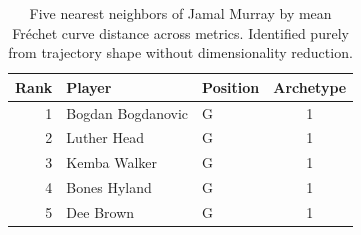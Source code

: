 \begin{table}[htbp]
  \centering\small
  \begin{tabular}{rllc}
    \toprule
    Rank & Player & Position & Archetype \\
    \midrule
    1 & Bogdan Bogdanovic & G & 1 \\
    2 & Luther Head & G & 1 \\
    3 & Kemba Walker & G & 1 \\
    4 & Bones Hyland & G & 1 \\
    5 & Dee Brown & G & 1 \\
    \bottomrule
  \end{tabular}
  \caption{Five nearest neighbors of Jamal Murray by mean Fr\'{e}chet curve distance across metrics. Identified purely from trajectory shape without dimensionality reduction.}
  \label{tab:Jamal_Murray_frechet_curve_neighbors}
\end{table}

